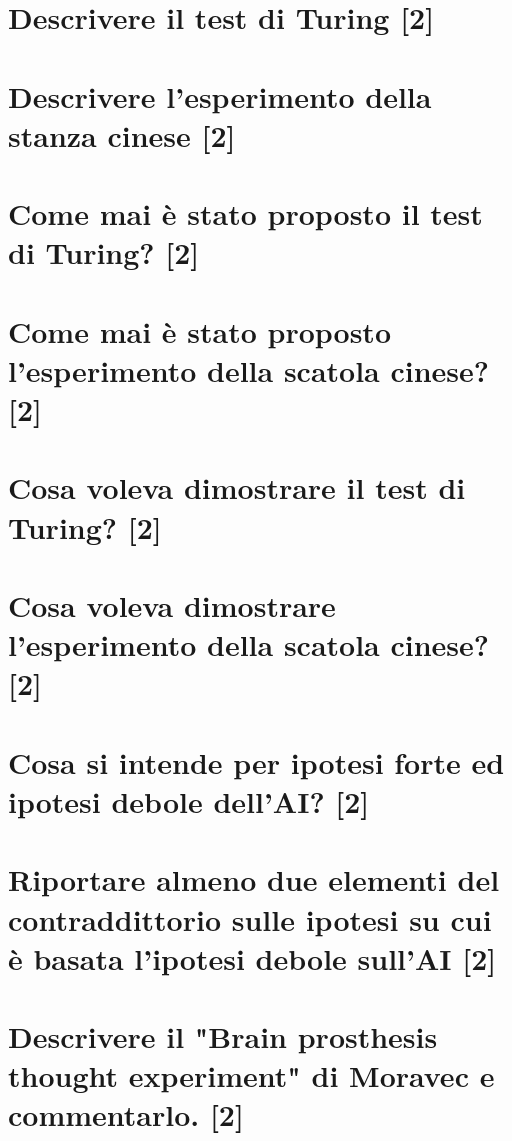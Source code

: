 \documentclass[\main/main.tex]{subfiles}
\begin{document}
\section{Descrivere il test di Turing [2]}
\section{Descrivere l'esperimento della stanza cinese [2]}
\section{Come mai è stato proposto il test di Turing? [2]}
\section{Come mai è stato proposto l'esperimento della scatola cinese? [2]}
\section{Cosa voleva dimostrare il test di Turing? [2]}
\section{Cosa voleva dimostrare l'esperimento della scatola cinese? [2]}
\section{Cosa si intende per ipotesi forte ed ipotesi debole dell'AI? [2]}
\section{Riportare almeno due elementi del contraddittorio sulle ipotesi su cui è basata l'ipotesi debole sull'AI [2]}
\section{Descrivere il "Brain prosthesis thought experiment" di Moravec e commentarlo. [2]}
\end{document}
